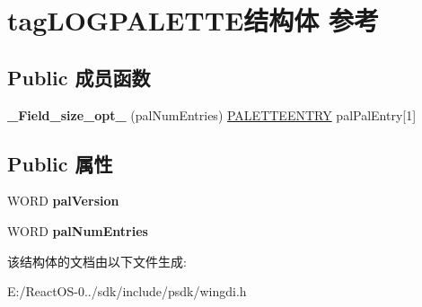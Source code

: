 \hypertarget{structtag_l_o_g_p_a_l_e_t_t_e}{}\section{tag\+L\+O\+G\+P\+A\+L\+E\+T\+T\+E结构体 参考}
\label{structtag_l_o_g_p_a_l_e_t_t_e}
\subsection*{Public 成员函数}
\begin{DoxyCompactItemize}
\item 
\mbox{\label{structtag_l_o_g_p_a_l_e_t_t_e_a0417964f2223638598b54f011031825b}} 
{\bfseries \+\_\+\+Field\+\_\+size\+\_\+opt\+\_\+} (pal\+Num\+Entries) \hyperlink{structtag_p_a_l_e_t_t_e_e_n_t_r_y}{P\+A\+L\+E\+T\+T\+E\+E\+N\+T\+RY} pal\+Pal\+Entry\mbox{[}1\mbox{]}
\end{DoxyCompactItemize}
\subsection*{Public 属性}
\begin{DoxyCompactItemize}
\item 
\mbox{\label{structtag_l_o_g_p_a_l_e_t_t_e_a99854ed5d2f093e134db5e57d8302af7}} 
W\+O\+RD {\bfseries pal\+Version}
\item 
\mbox{\label{structtag_l_o_g_p_a_l_e_t_t_e_a578a0f14c54096b551ee2ac06bbc211b}} 
W\+O\+RD {\bfseries pal\+Num\+Entries}
\end{DoxyCompactItemize}


该结构体的文档由以下文件生成\+:\begin{DoxyCompactItemize}
\item 
E\+:/\+React\+O\+S-\/0../sdk/include/psdk/wingdi.\+h\end{DoxyCompactItemize}
